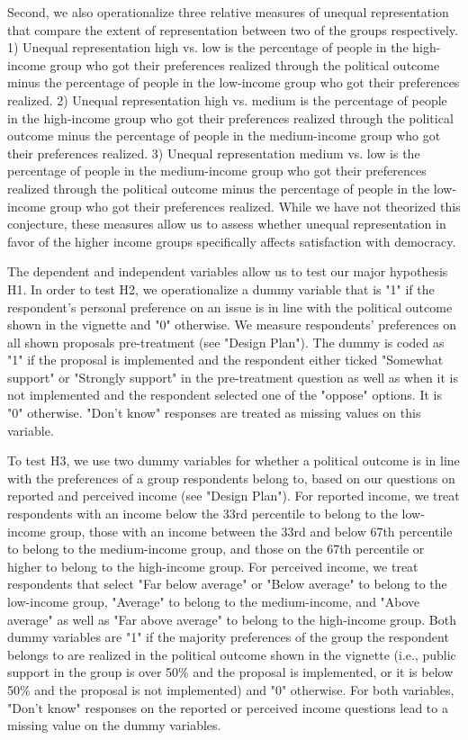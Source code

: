 \documentclass[12pt, letterpaper]{article}
\begin{document}
\begin{spacing}{1.5}
Second, we also operationalize three relative measures of unequal representation that compare the extent of representation between two of the groups respectively. 1) Unequal representation high vs. low is the percentage of people in the high- income group who got their preferences realized through the political outcome minus the percentage of people in the low-income group who got their preferences realized. 2) Unequal representation high vs. medium is the percentage of people in the high-income group who got their preferences realized through the political outcome minus the percentage of people in the medium-income group who got their preferences realized. 3) Unequal representation medium vs. low is the percentage of people in the medium-income group who got their preferences realized through the political outcome minus the percentage of people in the low- income group who got their preferences realized. While we have not theorized this conjecture, these measures allow us to assess whether unequal representation in favor of the higher income groups specifically affects satisfaction with democracy.

The dependent and independent variables allow us to test our major hypothesis H1. In order to test H2, we operationalize a dummy variable that is "1" if the respondent's personal preference on an issue is in line with the political outcome shown in the vignette and "0" otherwise. We measure respondents' preferences on all shown proposals pre-treatment (see "Design Plan"). The dummy is coded as "1" if the proposal is implemented and the respondent either ticked "Somewhat support" or "Strongly support" in the pre-treatment question as well as when it is not implemented and the respondent selected one of the "oppose" options. It is "0" otherwise. "Don't know" responses are treated as missing values on this variable.

To test H3, we use two dummy variables for whether a political outcome is in line with the preferences of a group respondents belong to, based on our questions on reported and perceived income (see "Design Plan"). For reported income, we treat respondents with an income below the 33rd percentile to belong to the low-income group, those with an income between the 33rd and below 67th percentile to belong to the medium-income group, and those on the 67th percentile or higher to belong to the high-income group. For perceived income, we treat respondents that select "Far below average" or "Below average" to belong to the low-income group, "Average" to belong to the medium-income, and "Above average" as well as "Far above average" to belong to the high-income group. Both dummy variables are "1" if the majority preferences of the group the respondent belongs to are realized in the political outcome shown in the vignette (i.e., public support in the group is over 50\% and the proposal is implemented, or it is below 50\% and the proposal is not implemented) and "0" otherwise. For both variables, "Don't know" responses on the reported or perceived income questions lead to a missing value on the dummy variables.


\end{spacing}
\end{document}
